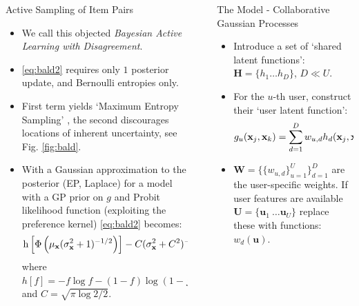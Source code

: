 \documentclass[final]{beamer}
\newlength{\sepwid}
\newlength{\onecolwid}
\newcommand{\x}{\mathbf{x}}
\begin{document}
\begin{frame}[t]
\begin{columns}[t]
\begin{column}{\onecolwid}
\begin{block}{Active Sampling of Item Pairs}
\begin{itemize}
\begin{align}
            \label{eq:bald2}
          \end{align}
        \item We call this objected \emph{Bayesian Active Learning with Disagreement}.
        \item \eqref{eq:bald2} requires only $1$ posterior update, and Bernoulli entropies only.
        \item First term yields `Maximum Entropy Sampling' \cite{sebastiani2000}, the second
        discourages locations of inherent uncertainty, see Fig. \ref{fig:bald}.
        \item With a Gaussian approximation to the posterior (EP, Laplace) for a model with a GP
        prior on $g$ and Probit likelihood function (exploiting the preference kernel)
        \eqref{eq:bald2} becomes:
        \begin{equation}
        \mathrm{h} \left[ \Phi\left( \mu_{\x}(\sigma^2_{\x} + 1)^{-1/2} \right)\right] -
        C(\sigma_{\x}^2 + C^2)^{-1/2} \exp\left(-\mu_{\x}^2(2\left(\sigma_{\x}^2 +
        C^2\right))^{-1}\right)\,.\notag
        \end{equation}
        where $h[f] = -f\log f - (1-f)\log(1-f)$ and $C=\sqrt{\pi\log 2 / 2}$.
      \end{itemize}
      \end{block}

    \end{column}

    \begin{column}{\sepwid}\end{column} %

    \begin{column}{\onecolwid}

      \begin{alertblock}{The Model - Collaborative Gaussian Processes}
        \begin{itemize}
          \item Introduce a set of `shared latent functions':
            $\mathbf{H} = \{h_1\ldots h_D\}$, $D \ll U$.
          \item For the $u$-th user, construct their `user latent function':
            \begin{equation}
              g_{u}(\mathbf{x}_j,\mathbf{x}_k)=\sum_{d=1}^{D}w_{u,d}h_{d}
                (\mathbf{x}_j,\mathbf{x}_k)\,.\notag
            \end{equation}
          \item $\mathbf{W} = \{\{w_{u, d}\}_{u=1}^U\}_{d=1}^D$ are the user-specific weights.
          If user features are available
            $\mathbf{U} = \{\mathbf{u}_1\ \ldots \mathbf{u}_U\}$ replace these with functions:
            $w_d(\mathbf{u})$.
        \end{itemize}
      \end{alertblock}


\end{column}
\end{columns}
\end{frame}
\end{document}
